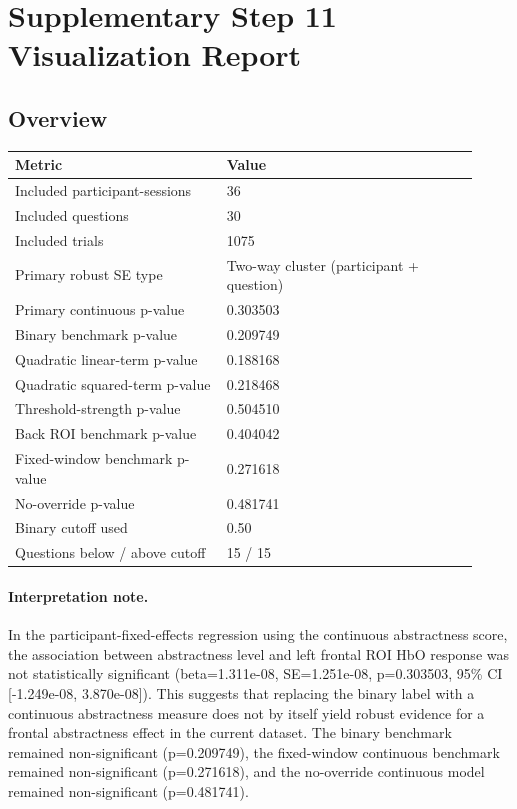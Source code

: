 \documentclass[11pt]{article}
\begin{document}
\section*{Supplementary Step 11 Visualization Report}
\subsection*{Overview}
\begin{tabular}{p{0.42\linewidth}p{0.50\linewidth}}
\toprule
Metric & Value\\
\midrule
Included participant-sessions & 36\\
Included questions & 30\\
Included trials & 1075\\
Primary robust SE type & Two-way cluster (participant + question)\\
Primary continuous p-value & 0.303503\\
Binary benchmark p-value & 0.209749\\
Quadratic linear-term p-value & 0.188168\\
Quadratic squared-term p-value & 0.218468\\
Threshold-strength p-value & 0.504510\\
Back ROI benchmark p-value & 0.404042\\
Fixed-window benchmark p-value & 0.271618\\
No-override p-value & 0.481741\\
Binary cutoff used & 0.50\\
Questions below / above cutoff & 15 / 15\\
\bottomrule
\end{tabular}
\paragraph{Interpretation note.} In the participant-fixed-effects regression using the continuous abstractness score, the association between abstractness level and left frontal ROI HbO response was not statistically significant (beta=1.311e-08, SE=1.251e-08, p=0.303503, 95\% CI [-1.249e-08, 3.870e-08]). This suggests that replacing the binary label with a continuous abstractness measure does not by itself yield robust evidence for a frontal abstractness effect in the current dataset. The binary benchmark remained non-significant (p=0.209749), the fixed-window continuous benchmark remained non-significant (p=0.271618), and the no-override continuous model remained non-significant (p=0.481741).
\end{document}
